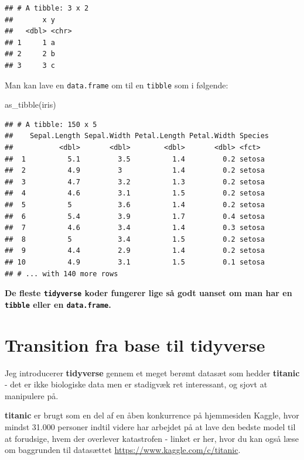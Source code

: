 \documentclass[
]{book}
\newenvironment{Shaded}{\begin{snugshade}}{\end{snugshade}}
\newcommand{\FunctionTok}[1]{\textcolor[rgb]{0.00,0.00,0.00}{#1}}
\newcommand{\NormalTok}[1]{#1}
\begin{document}
\begin{verbatim}
## # A tibble: 3 x 2
##       x y    
##   <dbl> <chr>
## 1     1 a    
## 2     2 b    
## 3     3 c
\end{verbatim}

Man kan lave en \texttt{data.frame} om til en \texttt{tibble} som i følgende:

\begin{Shaded}
\begin{Highlighting}[]
\FunctionTok{as\_tibble}\NormalTok{(iris)}
\end{Highlighting}
\end{Shaded}

\begin{verbatim}
## # A tibble: 150 x 5
##    Sepal.Length Sepal.Width Petal.Length Petal.Width Species
##           <dbl>       <dbl>        <dbl>       <dbl> <fct>  
##  1          5.1         3.5          1.4         0.2 setosa 
##  2          4.9         3            1.4         0.2 setosa 
##  3          4.7         3.2          1.3         0.2 setosa 
##  4          4.6         3.1          1.5         0.2 setosa 
##  5          5           3.6          1.4         0.2 setosa 
##  6          5.4         3.9          1.7         0.4 setosa 
##  7          4.6         3.4          1.4         0.3 setosa 
##  8          5           3.4          1.5         0.2 setosa 
##  9          4.4         2.9          1.4         0.2 setosa 
## 10          4.9         3.1          1.5         0.1 setosa 
## # ... with 140 more rows
\end{verbatim}

\textbf{De fleste \texttt{tidyverse} koder fungerer lige så godt uanset om man har en \texttt{tibble} eller en \texttt{data.frame}. }

\hypertarget{transition-fra-base-til-tidyverse}{%
\section{Transition fra base til tidyverse}\label{transition-fra-base-til-tidyverse}}

Jeg introducerer \textbf{tidyverse} gennem et meget berømt datasæt som hedder \textbf{titanic} - det er ikke biologiske data men er stadigvæk ret interessant, og sjovt at manipulere på.

\textbf{titanic} er brugt som en del af en åben konkurrence på hjemmesiden Kaggle, hvor mindst 31.000 personer indtil videre har arbejdet på at lave den bedste model til at forudsige, hvem der overlever katastrofen - linket er her, hvor du kan også læse om baggrunden til datasættet \url{https://www.kaggle.com/c/titanic}.
\end{document}
